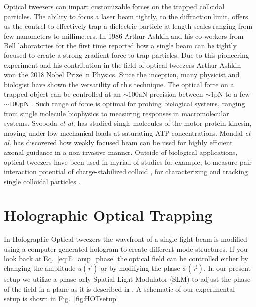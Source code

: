 Optical tweezers can impart customizable forces on the trapped colloidal particles. The ability to focus a laser beam tightly, to the diffraction limit, offers us the control to effectively trap a dielectric particle at length scales ranging from few nanometers to millimeters. In 1986 Arthur Ashkin and his co-workers \cite{Ashkin:86} from Bell laboratories for the first time reported how a single beam can be tightly focused to create a strong gradient force to trap particles. Due to this pioneering experiment and his contribution in the field of optical tweezers Arthur Ashkin won the 2018 Nobel Prize in Physics\cite{nobel_media_2019}. Since the inception, many physicist and biologist have shown the versatility of this technique\cite{grier2003nature}. The optical force on a trapped object can be controlled at an $\sim 100 \mathrm{aN}$ precision between $\sim 1 \mathrm{pN}$ to a few $\sim 100\mathrm{pN}$ \cite{Rohrbach:02}. Such range of force is optimal for probing biological systems, ranging from single molecule biophysics to measuring responses in macromolecular systems\cite{Svoboda1994,Litvinov7426,Brouhard2003}. Svoboda \emph{et al.} \cite{Svoboda11782} has studied single molecules of the motor protein kinesin, moving under low mechanical loads at saturating ATP concentrations. Mondal \emph{et al.} \cite{argha2014} has discovered how weakly focused beam can be used for highly efficient axonal guidance in a non-invasive manner. Outside of biological applications, optical tweezers have been used in myriad of studies for example, to measure pair interaction potential of charge-stabilized colloid \cite{crocker1994}, for characterizing and tracking single colloidal particles \cite{Lee07colloid, Cheong2009, xiao2010, chen2015, chen2016}.


\section{Holographic Optical Trapping}
\label{sec:HOT}
In Holographic Optical tweezers the wavefront of a single light beam is modified using a computer generated hologram to create different mode structures. If you look back at Eq.~\eqref{eq:E_amp_phase} the optical field can be controlled either by changing the amplitude $u(\vec{r})$ or by modifying the phase $\phi (\vec{r})$. In our present setup we utilize a phase-only Spatial Light Modulator (SLM) \cite{Igasaki1999} to adjust the phase of the field in a plane as it is described in \cite{he1995, dufrense2001hot, CURTIS2002169, Grier:06, Polin:05}. A schematic of our experimental setup is shown in Fig.~\ref{fig:HOTsetup}

